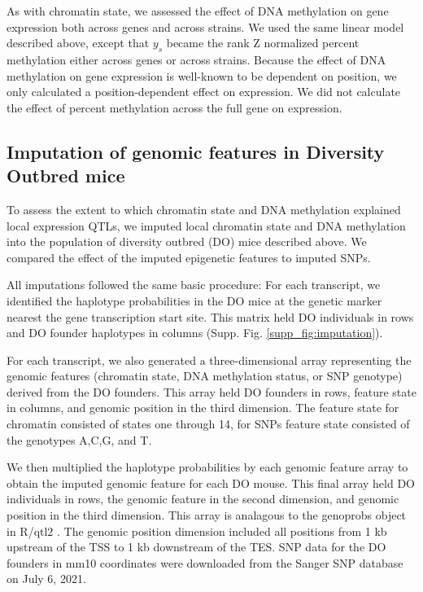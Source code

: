 \documentclass[
  11pt,
]{article}
\begin{document}
As with chromatin state, we assessed the effect of DNA methylation on
gene expression both across genes and across strains. We used the same
linear model described above, except that \(y_{s}\) became the rank Z
normalized percent methylation either across genes or across strains.
Because the effect of DNA methylation on gene expression is well-known
to be dependent on position, we only calculated a position-dependent
effect on expression. We did not calculate the effect of percent
methylation across the full gene on expression.

\hypertarget{imputation-of-genomic-features-in-diversity-outbred-mice}{%
\subsection{Imputation of genomic features in Diversity Outbred
mice}\label{imputation-of-genomic-features-in-diversity-outbred-mice}}

To assess the extent to which chromatin state and DNA methylation
explained local expression QTLs, we imputed local chromatin state and
DNA methylation into the population of diversity outbred (DO) mice
described above. We compared the effect of the imputed epigenetic
features to imputed SNPs.

All imputations followed the same basic procedure: For each transcript,
we identified the haplotype probabilities in the DO mice at the genetic
marker nearest the gene transcription start site. This matrix held DO
individuals in rows and DO founder haplotypes in columns (Supp. Fig.
\ref{supp_fig:imputation}).

For each transcript, we also generated a three-dimensional array
representing the genomic features (chromatin state, DNA methylation
status, or SNP genotype) derived from the DO founders. This array held
DO founders in rows, feature state in columns, and genomic position in
the third dimension. The feature state for chromatin consisted of states
one through 14, for SNPs feature state consisted of the genotypes A,C,G,
and T.

We then multiplied the haplotype probabilities by each genomic feature
array to obtain the imputed genomic feature for each DO mouse. This
final array held DO individuals in rows, the genomic feature in the
second dimension, and genomic position in the third dimension. This
array is analagous to the genoprobs object in R/qtl2
\citep{pmid30591514}. The genomic position dimension included all
positions from 1 kb upstream of the TSS to 1 kb downstream of the TES.
SNP data for the DO founders in mm10 coordinates were downloaded from
the Sanger SNP database \citep{keane2011mouse} on July 6, 2021.
\end{document}
